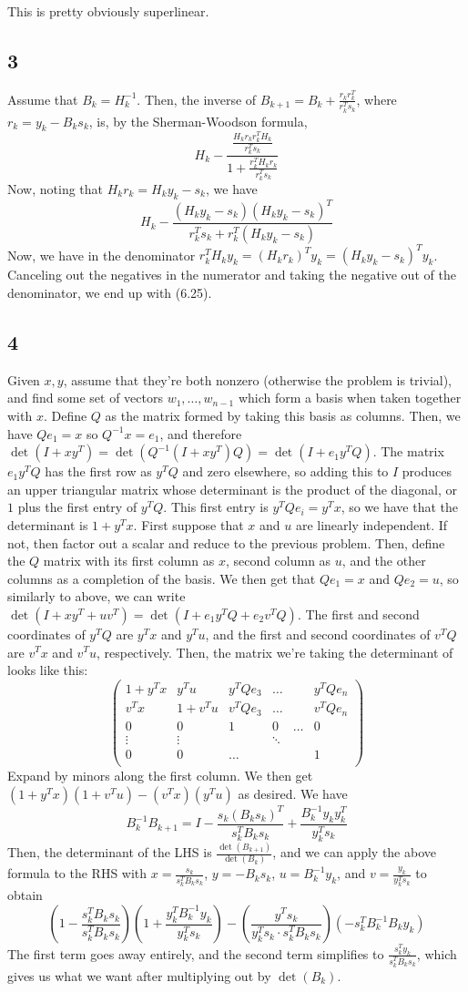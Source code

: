 \documentclass{article}
\newcommand{\openm}{\begin{pmatrix}}
\newcommand{\closem}{\end{pmatrix}}
\begin{document}
This is pretty obviously superlinear.
\subsection*{3}
Assume that $B_k=H_k^{-1}$. Then, the inverse of $B_{k+1}=B_k+\frac{r_kr_k^T}{r_k^Ts_k}$, where $r_k=y_k-B_ks_k$, is, by the Sherman-Woodson formula, 
\[H_k-\frac{\frac{H_kr_kr_k^TH_k}{r_k^Ts_k}}{1+\frac{r_k^TH_kr_k}{r_k^Ts_k}}\]
Now, noting that $H_kr_k=H_ky_k-s_k$, we have
\[H_k-\frac{(H_ky_k-s_k)(H_ky_k-s_k)^T}{r_k^Ts_k+r_k^T(H_ky_k-s_k)}\]
Now, we have in the denominator $r_k^TH_ky_k=(H_kr_k)^Ty_k=(H_ky_k-s_k)^Ty_k$. Canceling out the negatives in the numerator and taking the negative out of the denominator, we end up with (6.25).
\subsection*{4}
Given $x, y$, assume that they're both nonzero (otherwise the problem is trivial), and find some set of vectors $w_1,\ldots,w_{n-1}$ which form a basis when taken together with $x$. Define $Q$ as the matrix formed by taking this basis as columns. Then, we have $Qe_1=x$ so $Q^{-1}x=e_1$, and therefore $\det(I+xy^T)=\det(Q^{-1}(I+xy^T)Q)=\det(I+e_1y^TQ)$. The matrix $e_1y^TQ$ has the first row as $y^TQ$ and zero elsewhere, so adding this to $I$ produces an upper triangular matrix whose determinant is the product of the diagonal, or $1$ plus the first entry of $y^TQ$. This first entry is $y^TQe_i=y^Tx$, so we have that the determinant is $1+y^Tx$.
First suppose that $x$ and $u$ are linearly independent. If not, then factor out a scalar and reduce to the previous problem. Then, define the $Q$ matrix with its first column as $x$, second column as $u$, and the other columns as a completion of the basis. We then get that $Qe_1=x$ and $Qe_2=u$, so similarly to above, we can write $\det(I+xy^T+uv^T)=\det(I+e_1y^TQ+e_2v^TQ)$. The first and second coordinates of $y^TQ$ are $y^Tx$ and $y^Tu$, and the first and second coordinates of $v^TQ$ are $v^Tx$ and $v^Tu$, respectively. Then, the matrix we're taking the determinant of looks like this:
\[\openm 1+y^Tx&y^Tu&y^TQe_3&\hdots&&y^TQe_n\\
v^Tx&1+v^Tu&v^TQe_3&\hdots&&v^TQe_n\\
0&0&1&0&\hdots&0\\
\vdots&\vdots&&\ddots\\
0&0&\hdots&&&1\\
\closem\]
Expand by minors along the first column. We then get $(1+y^Tx)(1+v^Tu)-(v^Tx)(y^Tu)$ as desired.
We have 
\[B_k^{-1}B_{k+1}=I-\frac{s_k(B_ks_k)^T}{s_k^TB_ks_k}+\frac{B_k^{-1}y_ky_k^T}{y_k^Ts_k}\]
Then, the determinant of the LHS is $\frac{\det(B_{k+1})}{\det(B_k)}$, and we can apply the above formula to the RHS with $x=\frac{s_k}{s_k^TB_ks_k}$, $y=-B_ks_k$, $u=B_k^{-1}y_k$, and $v=\frac{y_k}{y_k^Ts_k}$ to obtain
\[\left(1-\frac{s_k^TB_ks_k}{s_k^TB_ks_k}\right)\left(1+\frac{y_k^TB_k^{-1}y_k}{y_k^Ts_k}\right)-\left(\frac{y^Ts_k}{y_k^Ts_k\cdot s_k^TB_ks_k}\right)\left(-s_k^TB_k^{-1}B_ky_k\right)
\]
The first term goes away entirely, and the second term simplifies to $\frac{s_k^Ty_k}{s_k^TB_ks_k}$, which gives us what we want after multiplying out by $\det(B_k)$.
\end{document}
